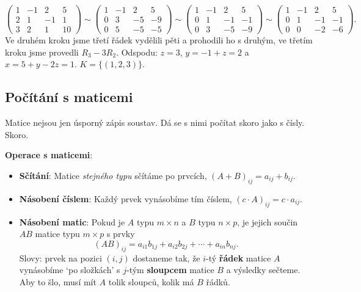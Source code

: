 \begin{solution}
  \begin{equation*}
    \left(\begin{array}{rrr|r}
      1 & -1 & 2 & 5\\
      2 & 1 & -1 & 1\\
      3 & 2 & 1 & 10
    \end{array}\right)
    \sim
    \left(\begin{array}{rrr|r}
      1 & -1 & 2 & 5\\
      0 & 3 & -5 & -9\\
      0 & 5 & -5 & -5
    \end{array}\right)
    \sim
    \left(\begin{array}{rrr|r}
      1 & -1 & 2 & 5\\
      0 & 1 & -1 & -1\\
      0 & 3 & -5 & -9
    \end{array}\right)
    \sim
    \left(\begin{array}{rrr|r}
      1 & -1 & 2 & 5\\
      0 & 1 & -1 & -1\\
      0 & 0 & -2 & -6
    \end{array}\right).
  \end{equation*}
  Ve druhém kroku jsme třetí řádek vydělili pěti a prohodili ho s druhým, ve třetím kroku jsme provedli $R_3 - 3R_2$. Odspodu: $z = 3$, $y = -1 + z = 2$ a $x = 5 + y - 2z = 1$. $K = \{(1, 2, 3)\}$.
\end{solution}

\subsection{Počítání s maticemi}\label{sec:pocitani-s-maticemi}

Matice nejsou jen úsporný zápis soustav. Dá se s nimi počítat skoro jako s čísly. Skoro.

\begin{definitionbox}
  \textbf{Operace s maticemi}:
  \begin{itemize}
    \item \textbf{Sčítání}: Matice \textit{stejného typu} sčítáme po prvcích, $(A + B)_{ij} = a_{ij} + b_{ij}$.
    \item \textbf{Násobení číslem}: Každý prvek vynásobíme tím číslem, $(c\cdot A)_{ij} = c\cdot a_{ij}$.
    \item \textbf{Násobení matic}: Pokud je $A$ typu $m\times n$ a $B$ typu $n\times p$, je jejich součin $AB$ matice typu $m\times p$ s prvky
    \begin{equation*}
      (AB)_{ij} = a_{i1}b_{1j} + a_{i2}b_{2j} + \cdots + a_{in}b_{nj}.
    \end{equation*}
    Slovy: prvek na pozici $(i, j)$ dostaneme tak, že $i$-tý \textbf{řádek} matice $A$ vynásobíme `po složkách' s $j$-tým \textbf{sloupcem} matice $B$ a výsledky sečteme. Aby to šlo, musí mít $A$ tolik sloupců, kolik má $B$ řádků.
  \end{itemize}
\end{definitionbox}

